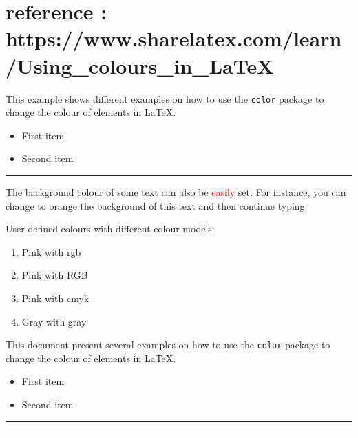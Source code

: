 \documentclass{scrbook}
\begin{document}
\section{reference : https://www.sharelatex.com/learn/Using_colours_in_LaTeX}


This example shows different examples on how to use the \texttt{color} package
to change the colour of elements in \LaTeX.

\begin{itemize}
\color{ForestGreen}
\item First item
\item Second item
\end{itemize}

\noindent
{\color{RubineRed} \rule{\linewidth}{0.5mm} }

The background colour of some text can also be \textcolor{red}{easily} set. For
instance, you can change to orange the background of \colorbox{BurntOrange}{this
text} and then continue typing.


User-defined colours with different colour models:

\begin{enumerate}
\item \textcolor{mypink1}{Pink with rgb}
\item \textcolor{mypink2}{Pink with RGB}
\item \textcolor{mypink3}{Pink with cmyk}
\item \textcolor{mygray}{Gray with gray}
\end{enumerate}

This document present several examples on how to use the \texttt{color} package
to change the colour of elements in \LaTeX.

\begin{itemize}
\item \textcolor{Mycolor1}{First item}
\item \textcolor{Mycolor2}{Second item}
\end{itemize}

\noindent
{\color{LightRubineRed} \rule{\linewidth}{1mm} }

\noindent
{\color{RubineRed} \rule{\linewidth}{1mm} }
\end{document}
